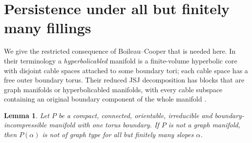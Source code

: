 \documentclass[11pt]{article}
\newtheorem{lemma}[theorem]{Lemma}
\begin{document}
\section{Persistence under all but finitely many fillings}

We give the restricted consequence of Boileau--Cooper that is needed
here. In their terminology a \emph{hyperbolicabled} manifold is a
finite-volume hyperbolic core with disjoint cable spaces attached to
some boundary tori; each cable space has a free outer boundary torus.
Their reduced JSJ decomposition has blocks that are graph manifolds
or hyperbolicabled manifolds, with every cable subspace containing
an original boundary component of the whole manifold
\cite[pp.~50--51]{bc}.

\begin{lemma}\label{lem:persistence}
Let $P$ be a compact, connected, orientable, irreducible and
boundary-incompressible manifold with one torus boundary. If $P$ is
not a graph manifold, then $P(\alpha)$ is not of graph type for all
but finitely many slopes $\alpha$.
\end{lemma}
\end{document}
